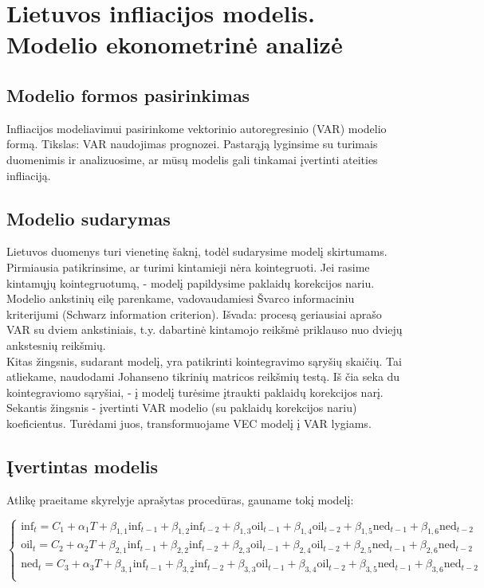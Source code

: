 \documentclass[a4paper]{article}
\begin{document}
\newpage
\section{Lietuvos infliacijos modelis. Modelio ekonometrinė analizė}
	\subsection{Modelio formos pasirinkimas}

Infliacijos modeliavimui pasirinkome vektorinio autoregresinio (VAR) modelio formą. Tikslas: VAR naudojimas prognozei. Pastarąją lyginsime su turimais duomenimis ir analizuosime, ar mūsų modelis gali tinkamai įvertinti ateities infliaciją.

	\subsection{Modelio sudarymas}

Lietuvos duomenys turi vienetinę šaknį, todėl sudarysime modelį skirtumams.  Pirmiausia patikrinsime, ar turimi kintamieji nėra kointegruoti. Jei rasime kintamųjų kointegruotumą, - modelį papildysime paklaidų korekcijos nariu.\\
Modelio ankstinių eilę parenkame, vadovaudamiesi Švarco informaciniu kriterijumi (Schwarz information criterion). Išvada:  procesą geriausiai aprašo VAR su dviem ankstiniais, t.y. dabartinė kintamojo reikšmė priklauso nuo dviejų ankstesnių reikšmių.\\
Kitas žingsnis, sudarant modelį, yra patikrinti kointegravimo sąryšių skaičių. Tai atliekame, naudodami Johanseno tikrinių matricos reikšmių testą. Iš čia seka du kointegraviomo sąryšiai, -  į modelį turėsime įtraukti paklaidų korekcijos narį.\\Sekantis žingsnis - įvertinti VAR modelio (su paklaidų korekcijos nariu) koeficientus. Turėdami juos, transformuojame VEC modelį į VAR lygiams.
\newpage
	\subsection{Įvertintas modelis}
Atlikę praeitame skyrelyje aprašytas procedūras, gauname tokį modelį:

\vspace{3mm}
$\begin{cases}
\text{inf}_{t} = C_{1} + \alpha_{1} T + \beta_{1,1} \text{inf}_{t-1} + \beta_{1,2} \text{inf}_{t-2} + \beta_{1,3} \text{oil}_{t-1} + \beta_{1,4} \text{oil}_{t-2} +  \beta_{1,5} \text{ned}_{t-1} + \beta_{1,6} \text{ned}_{t-2}\\
\text{oil}_{t} = C_{2} + \alpha_{2} T + \beta_{2,1} \text{inf}_{t-1} + \beta_{2,2} \text{inf}_{t-2} + \beta_{2,3} \text{oil}_{t-1} + \beta_{2,4} \text{oil}_{t-2} +  \beta_{2,5} \text{ned}_{t-1} + \beta_{2,6} \text{ned}_{t-2}\\
\text{ned}_{t} = C_{3} + \alpha_{3} T + \beta_{3,1} \text{inf}_{t-1} + \beta_{3,2} \text{inf}_{t-2} + \beta_{3,3} \text{oil}_{t-1} + \beta_{3,4} \text{oil}_{t-2} +  \beta_{3,5} \text{ned}_{t-1} + \beta_{3,6} \text{ned}_{t-2}\\
\end{cases}$
\vspace{3mm}
\end{document}
